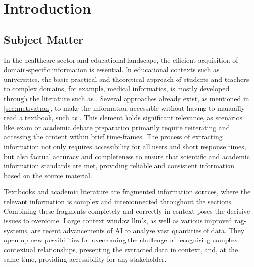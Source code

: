 \chapter{Introduction}\label{ch:introduction}
\section{Subject Matter}\label{sec:subject matter}
In the healthcare sector and educational landscape, the efficient acquisition of domain-specific information is essential. 
In educational contexts such as universities, the basic practical and theoretical approach of students and teachers to complex domains, for example, medical informatics, is mostly developed through the literature such as \citet{bb2}.
%
Several approaches already exist, as mentioned in \cref{sec:motivation}, to make the information accessible without having to manually read a textbook, such as \citet{bb2}.
This element holds significant relevance, as scenarios like exam or academic debate preparation primarily require reiterating and accessing the content within brief time-frames.
%
The process of extracting information not only requires accessibility for all users and short response times, but also factual accuracy and completeness to ensure that scientific and academic information standards are met, providing reliable and consistent information based on the source material.
 
Textbooks and academic literature are fragmented information sources, where the relevant information is complex and interconnected throughout the sections. 
Combining these fragments completely and correctly in context poses the decisive issues to overcome. 
%
Large context window \ac{llm}'s, as well as various improved \ac{rag}-systems, are recent advancements of AI to analyse vast quantities of data.
They open up new possibilities for overcoming the challenge of recognising complex contextual relationships, presenting the extracted data in context, and, at the same time, providing accessibility for any stakeholder.

